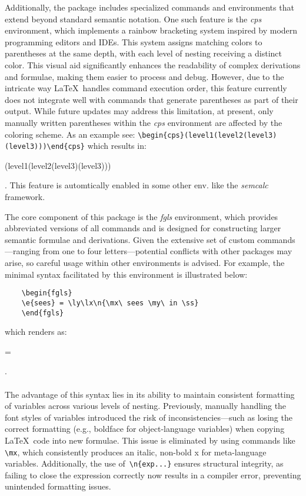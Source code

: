 \documentclass[10pt, a4paper]{article}
\begin{document}
	Additionally, the package includes specialized commands and environments that extend beyond standard semantic notation. One such feature is the \textit{cps} environment, which implements a rainbow bracketing system inspired by modern programming editors and IDEs. This system assigns matching colors to parentheses at the same depth, with each level of nesting receiving a distinct color. This visual aid significantly enhances the readability of complex derivations and formulae, making them easier to process and debug. However, due to the intricate way \LaTeX\ handles command execution order, this feature currently does not integrate well with commands that generate parentheses as part of their output. While future updates may address this limitation, at present, only manually written parentheses within the \textit{cps} environment are affected by the coloring scheme. 
	As an example see: \verb=\begin{cps}(level1(level2(level3)(level3)))\end{cps}= which results in:  \begin{cps}(level1(level2(level3)(level3)))\end{cps}.
	This feature is automtically enabled in some other env. like the \textit{semcalc} framework.
	
	The core component of this package is the \textit{fgls} environment, which provides abbreviated versions of all commands and is designed for constructing larger semantic formulae and derivations. Given the extensive set of custom commands—ranging from one to four letters—potential conflicts with other packages may arise, so careful usage within other environments is advised.
	\newpage
	For example, the minimal syntax facilitated by this environment is illustrated below:
	
	\begin{verbatim}
	\begin{fgls}
	\e{sees} = \ly\lx\n{\mx\ sees \my\ in \ss}
	\end{fgls}
	\end{verbatim} which renders as: 
	\\\begin{fgls}
		 = \ly\lx{}
	\end{fgls}.
	\\\ \\
	The advantage of this syntax lies in its ability to maintain consistent formatting of variables across various levels of nesting. Previously, manually handling the font styles of variables introduced the risk of in\-con\-sis\-ten\-cies—such as losing the correct formatting (e.g., boldface for object-language variables) when copying \LaTeX\ code into new formulae. This issue is eliminated by using commands like \verb=\mx=, which consistently produces an italic, non-bold x for meta-language variables. Additionally, the use of\ \verb=\n{exp...}= ensures structural integrity, as failing to close the expression correctly now results in a compiler error, preventing unintended formatting issues.
	
\end{document}
